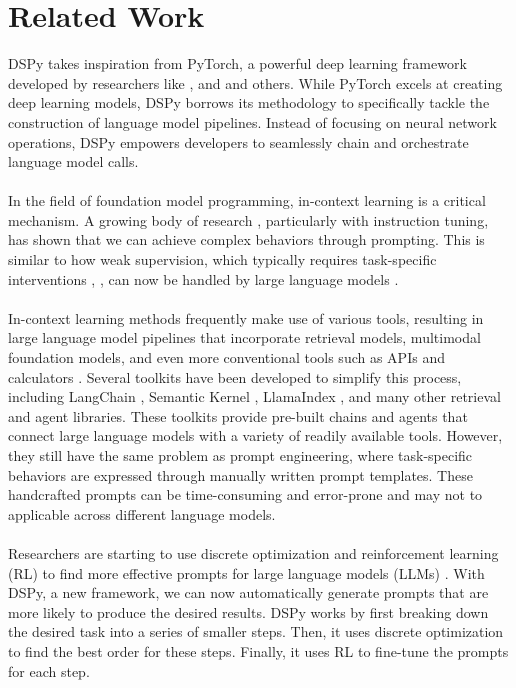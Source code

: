 \section{Related Work}
DSPy takes inspiration from PyTorch, a powerful deep learning framework developed by researchers like \textcite{Collobert2002}, \textcite{bergstra-proc-scipy-2010} and \textcite{chainer2015} and others. While PyTorch excels at creating deep learning models, DSPy borrows its methodology to specifically tackle the construction of language model pipelines. Instead of focusing on neural network operations, DSPy empowers developers to seamlessly chain and orchestrate language model calls.\\
\\
In the field of foundation model programming, in-context learning is a critical mechanism. A growing body of research \parencite{ouyang2022training}, particularly with instruction tuning, has shown that we can achieve complex behaviors through prompting. This is similar to how weak supervision, which typically requires task-specific interventions \parencite{ratner2017data}, \parencite{hancock2018training}, can now be handled by large language models \parencite{wang2023selfconsistency, zhang2022automatic, shao2023synthetic}.\\
\\
In-context learning methods frequently make use of various tools, resulting in large language model pipelines that incorporate retrieval models, multimodal foundation models, and even more conventional tools such as APIs and calculators \parencite{Lewis2020, izacard2022atlas}. Several toolkits have been developed to simplify this process, including LangChain \parencite{chase22}, Semantic Kernel \parencite{microsoft2023}, LlamaIndex \parencite{llama2022}, and many other retrieval and agent libraries. These toolkits provide pre-built chains and agents that connect large language models with a variety of readily available tools. However, they still have the same problem as prompt engineering, where task-specific behaviors are expressed through manually written prompt templates. These handcrafted prompts can be time-consuming and error-prone and may not to applicable across different language models.\\
\\
Researchers are starting to use discrete optimization and reinforcement learning (RL) to find more effective prompts for large language models (LLMs) \parencite{guo2023connecting, huang2022large, pryzant2023automatic}.  With DSPy, a new framework, we can now automatically generate prompts that are more likely to produce the desired results. DSPy works by first breaking down the desired task into a series of smaller steps. Then, it uses discrete optimization to find the best order for these steps. Finally, it uses RL to fine-tune the prompts for each step.\\
